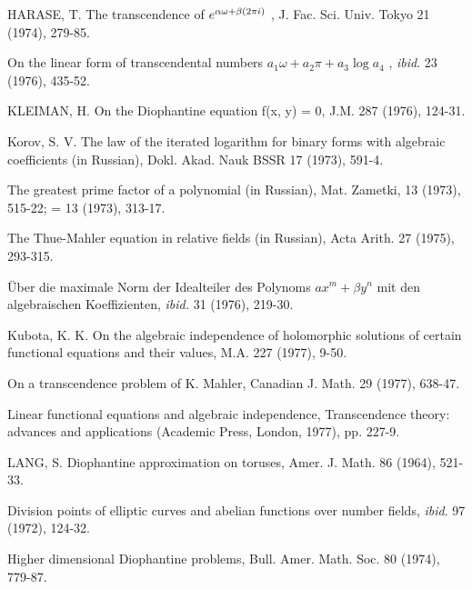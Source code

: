 \begin{hanglist}
    \item HARASE, T. The transcendence of  $e\index{transcendence of e}^{\alpha\omega+\beta(2\pi i)}$ , J. Fac. Sci. Univ. Tokyo 21 (1974), 279-85.
    \item \hspace{1.5em} On the linear form of transcendental numbers  $a_1\omega + a_2\pi + a_3 \log a_4$ , \textit{ibid}. 23 (1976), 435-52.
    \item KLEIMAN, H. On the Diophantine equation f(x, y) = 0, J.M. 287 (1976), 124-31.
    \item Korov, S. V. The law of the iterated logarithm for binary forms with algebraic coefficients (in Russian), Dokl. Akad. Nauk BSSR 17 (1973), 591-4.
    \item \hspace{1.5em} The greatest prime factor of a polynomial (in Russian), Mat. Zametki, 13 (1973), 515-22; = 13 (1973), 313-17.
    \item \hspace{1.5em} The Thue-Mahler equation in relative fields (in Russian), Acta Arith. 27 (1975), 293-315.
    \item \hspace{1.5em} Über die maximale Norm der Idealteiler des Polynoms  $ax^m + \beta y^n$  mit den algebraischen Koeffizienten, \textit{ibid.} 31 (1976), 219-30.
    \item Kubota, K. K. On the algebraic independence of holomorphic solutions of certain functional equations and their values, M.A. 227 (1977), 9-50.
    \item \hspace{1.5em} On a transcendence problem of K. Mahler, Canadian J. Math. 29 (1977), 638-47.
    \item \hspace{1.5em} Linear functional equations and algebraic independence, Transcendence theory: advances and applications (Academic Press, London, 1977), pp. 227-9.
    \item LANG, S. Diophantine approximation on toruses, Amer. J. Math. 86 (1964), 521-33.
    \item Division points of elliptic curves and abelian functions over number fields, \textit{ibid}. 97 (1972), 124-32.
    \item Higher dimensional Diophantine problems, Bull. Amer. Math. Soc. 80 (1974), 779-87.

\end{hanglist}
